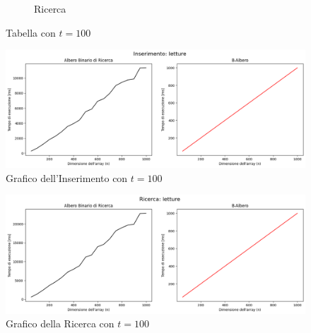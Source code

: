 \begin{figure}[H]
\begin{subfigure}[b]{0.49\textwidth}
        \caption{Ricerca}
        \label{fig:tablesearchtimet100}
    \end{subfigure}
    \caption{Tabella con $t=100$}
    \label{fig:tabletimest100}
\end{figure}

\begin{figure}[H]
    \centering
    \includegraphics[width=\textwidth]{side-graphs/insert-wr-t100.png}
    \caption{Grafico dell'Inserimento con $t=100$}
    \label{fig:sidegraphinserttimet100}
\end{figure}
    
\begin{figure}[H]
    \centering
    \includegraphics[width=\textwidth]{side-graphs/search-wr-t100.png}
    \caption{Grafico della Ricerca con $t=100$}
    \label{fig:sidegraphsearchtimet100}
\end{figure}

